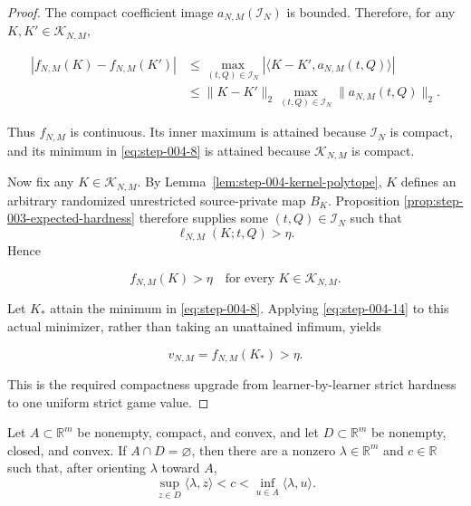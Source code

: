 \begin{proof}
The compact coefficient image
\(a_{N,M}(\mathcal I_N)\) is bounded. Therefore, for any
\(K,K'\in\mathcal K_{N,M}\),

\[
\begin{aligned}
|f_{N,M}(K)-f_{N,M}(K')|
&\le
\max_{(t,Q)\in\mathcal I_N}
  |\langle K-K',a_{N,M}(t,Q)\rangle|\\
&\le \|K-K'\|_2
\max_{(t,Q)\in\mathcal I_N}\|a_{N,M}(t,Q)\|_2.
\end{aligned}
\tag{S4.13}\label{eq:step-004-13}
\]

Thus \(f_{N,M}\) is continuous. Its inner maximum is attained because
\(\mathcal I_N\) is compact, and its minimum in \eqref{eq:step-004-8} is attained because
\(\mathcal K_{N,M}\) is compact.

Now fix any \(K\in\mathcal K_{N,M}\). By
Lemma~\ref{lem:step-004-kernel-polytope}, \(K\) defines an arbitrary
randomized unrestricted source-private map \(B_K\).  Proposition
\ref{prop:step-003-expected-hardness} therefore supplies some
\((t,Q)\in\mathcal I_N\) such that
\[
\ell_{N,M}(K;t,Q)>\eta.
\]
Hence

\[
f_{N,M}(K)>\eta
\quad\text{for every }K\in\mathcal K_{N,M}.
\tag{S4.14}\label{eq:step-004-14}
\]

Let \(K_*\) attain the minimum in \eqref{eq:step-004-8}. Applying \eqref{eq:step-004-14} to this actual
minimizer, rather than taking an unattained infimum, yields

\[
v_{N,M}=f_{N,M}(K_*)>\eta.
\tag{S4.15}\label{eq:step-004-15}
\]

This is the required compactness upgrade from learner-by-learner strict
hardness to one uniform strict game value. \end{proof}

\begin{lemma}\label{lem:step-004-strong-separation}
Let $A\subset\mathbb R^m$ be nonempty, compact, and convex, and let
$D\subset\mathbb R^m$ be nonempty, closed, and convex.  If
$A\cap D=\varnothing$, then there are a nonzero
$\lambda\in\mathbb R^m$ and $c\in\mathbb R$ such that, after orienting
$\lambda$ toward $A$,
\[
\sup_{z\in D}\langle\lambda,z\rangle
<c<
\inf_{u\in A}\langle\lambda,u\rangle.
\]
\end{lemma}

